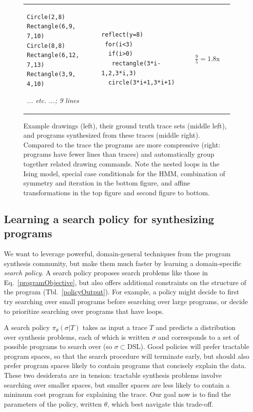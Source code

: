 \documentclass{article}
\theoremstyle{definition}
\begin{document}
\begin{figure}[t]
\begin{tabular}{m{1.5cm}llc}
\begin{minipage}{\exampleTraceSize}\begin{lstlisting}
Circle(2,8)
Rectangle(6,9, 7,10)
Circle(8,8)
Rectangle(6,12, 7,13)
Rectangle(3,9, 4,10)
\end{lstlisting}\small\emph{... etc. ...; 9 lines}
  \end{minipage}&\begin{minipage}{\exampleProgramSize}
\begin{lstlisting}
reflect(y=8)
 for(i<3)
  if(i>0)
   rectangle(3*i-1,2,3*i,3)
  circle(3*i+1,3*i+1)
\end{lstlisting}
\end{minipage}&$\frac{9}{5} = 1.8\text{x}$ %
  \end{tabular}
\caption{Example drawings (left), their ground truth trace sets (middle left), and programs synthesized from these traces (middle right). Compared to the trace the programs are more compressive (right: programs have fewer lines than traces) and automatically group together related drawing commands. Note the nested loops in the Ising model, special case conditionals for the HMM, combination of symmetry and iteration in the bottom figure, and affine transformations in the top figure and second figure to bottom.}\label{exampleSynthesisResults}
  \end{figure}

\subsection{Learning a search policy for synthesizing programs}\label{learningASearchPolicy}

We want to leverage powerful, domain-general techniques from the program synthesis community,
but make them much faster by
learning a domain-specific \emph{search policy}.
A search policy proposes search problems
like those in Eq.~\ref{programObjective},
but also offers additional constraints on the structure of the program (Tbl.~\ref{policyOutput}).
For example, a policy might decide to first try searching over small programs before searching over large programs,
or decide to prioritize searching over programs that have loops.

A search policy $\pi_\theta(\sigma  | T )$ takes as input a trace $T$ and predicts a distribution over synthesis problems, each of which is written $\sigma $ and corresponds to a set of possible programs to search over (so $\sigma \subset \text{DSL}$).
Good policies will prefer tractable program spaces,
so that the search procedure will terminate early, 
but should also prefer program spaces likely to contain
programs that concisely explain the data.
These two desiderata are in tension:
tractable synthesis problems involve searching over smaller spaces,
but smaller spaces are less likely to contain a minimum cost program
for explaining the trace.
Our goal now is to find the parameters of the policy, written $\theta$, which best navigate this trade-off.
\end{document}
